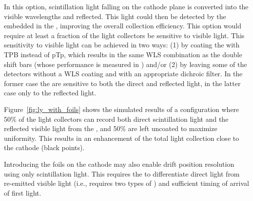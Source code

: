 In this option, scintillation light falling on the cathode plane is converted into the visible wavelengths and reflected. This light %
could then be detected by the  embedded in the , improving the overall collection efficiency. This option would require at least a fraction of the light collectors be sensitive to visible light. This sensitivity to visible light can be achieved in two ways: (1) by coating the  with TPB instead of pTp, which results in the same WLS combination as the double shift bars (whose performance is measured in )
and/or (2) by leaving some of the  detectors without a  
WLS coating and with an appropriate dichroic filter. In the former case the   are sensitive to both the direct and reflected light, in the latter case only to the reflected light. 

Figure~\ref{fig:ly_with_foils} shows the simulated results of a configuration where 50\% of the  light collectors can %
record both direct scintillation light and the reflected visible light from the ,  and 50\% are left uncoated to maximize uniformity. This results in an enhancement of the total light collection close to the cathode (black points). %

Introducing the foils on the cathode may also enable drift position resolution using only scintillation light. This requires the  to  
differentiate direct  light from re-emitted visible light (i.e., requires two 
types of ) and 
sufficient timing of arrival of first light.


